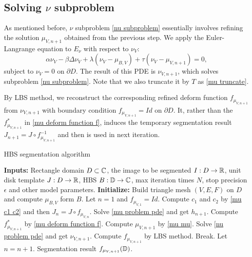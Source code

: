 \documentclass[review,onefignum,onetabnum]{siamonline190516}
\begin{document}
\subsection{Solving $\nu$ subproblem}
As mentioned before, $\nu$ subproblem \ref{nu subproblem} essentially involves refining the solution $\mu_{V,n+1}$ obtained from the previous step. We apply the Euler-Langrange equation to $E_\nu$ with respect to $\nu_V$:
\begin{equation}\label{nu problem pde}
    \alpha \nu_V - \beta \Delta \nu_V + \lambda (\nu_V - \mu_{B,V}) + \tau (\nu_V - \mu_{V,n+1}) = 0,
\end{equation}
subject to $\nu_V = 0$ on $\partial D$. The result of this PDE is $\nu_{V,n+1}$, which solves subproblem \ref{nu subproblem}. Note that we also truncate it by $T$ as \ref{mu truncate}.

By LBS method, we reconstruct the corresponding refined deform function $f_{\mu_{V,n+1}}$ from $\nu_{V,n+1}$ with boundary condition $f_{\mu_{V,n+1}} = Id$ on $\partial D$. It, rather than the $f_{\mu_{V,n+1}}^*$ in \ref{mu deform function f}, induces the temporary segmentation result $J_{n+1} = J \circ f_{\mu_{V,n+1}}^{-1}$ and then is used in next iteration.


\begin{algorithm}[H]
    \caption{HBS segmentation algorithm}
    \label{main alg}
    \begin{algorithmic} 
        \STATE \textbf{Inputs:} Rectangle domain $D \subset \mathbb{C}$, the image to be segmented $I: D \rightarrow \mathbb{R}$, unit disk template $J: D \rightarrow \mathbb{R}$, HBS $B: \mathbb{D} \rightarrow \mathbb{C}$, max iteration times $N$, stop precision $\epsilon$ and other model parameters.
        \STATE \textbf{Initialize:} Build triangle mesh $(V, E, F)$ on $D$ and compute $\mu_{B,V}$ form $B$.
        \STATE Let $n=1$ and $f_{\mu_{V,1}} = Id$.
        \STATE Compute $c_1$ and $c_2$ by \ref{mu c1 c2} and then $J_n = J \circ f_{\mu_{V,n}}$.
        \STATE Solve \ref{mu problem pde} and get $h_{n+1}$.
        \STATE Compute $f^*_{\mu_{V,n+1}}$ by \ref{mu deform function f}.
        \STATE Compute $\mu_{V,n+1}$ by \ref{mu mu}.
        \STATE Solve \ref{nu problem pde} and get $\nu_{V,n+1}$.
        \STATE Compute $f_{\mu_{V,n+1}}$ by LBS method.
        \STATE Break.
        \ENDIF
        \STATE Let $n = n+1$.
        \ENDWHILE
        \RETURN Segmentation result $f_{\mu_{V,n+1}}(\mathbb{D})$.
    \end{algorithmic}
\end{algorithm}
\end{document}
